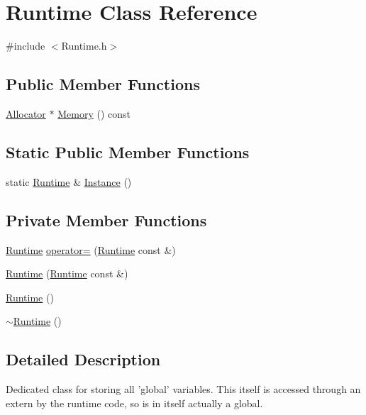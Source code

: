 \section{Runtime Class Reference}
\label{class_runtime}


{\ttfamily \#include $<$Runtime.\-h$>$}

\subsection*{Public Member Functions}
\begin{DoxyCompactItemize}
\item 
\hyperlink{class_allocator}{Allocator} $\ast$ \hyperlink{class_runtime_ad0f43e4d3f89778adb284d1d3f47287e}{Memory} () const 
\end{DoxyCompactItemize}
\subsection*{Static Public Member Functions}
\begin{DoxyCompactItemize}
\item 
static \hyperlink{class_runtime}{Runtime} \& \hyperlink{class_runtime_a1146c295df34dff8c1935ec0436edd7d}{Instance} ()
\end{DoxyCompactItemize}
\subsection*{Private Member Functions}
\begin{DoxyCompactItemize}
\item 
\hyperlink{class_runtime}{Runtime} \hyperlink{class_runtime_a69f3a8dea91a5f75ec52fa7ce9f5c3da}{operator=} (\hyperlink{class_runtime}{Runtime} const \&)
\item 
\hyperlink{class_runtime_a120a745fa3a6d5bae2ea5415163d79f9}{Runtime} (\hyperlink{class_runtime}{Runtime} const \&)
\item 
\hyperlink{class_runtime_a522dc4b36f2a770bbe3e62c451f38841}{Runtime} ()
\item 
\hyperlink{class_runtime_a69418e2a8c03d0e24cdc63eb88b52d28}{$\sim$\-Runtime} ()
\end{DoxyCompactItemize}


\subsection{Detailed Description}
Dedicated class for storing all 'global' variables. This itself is accessed through an extern by the runtime code, so is in itself actually a global.

